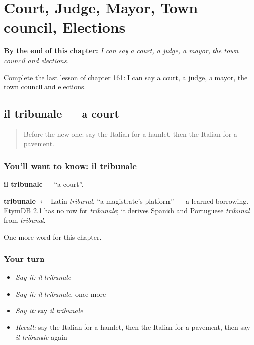 
\chapter{Court, Judge, Mayor, Town council, Elections}
\label{ch:it-court-judge-mayor-town-council-elections}

\begin{chapteropening}
\textbf{By the end of this chapter:} \emph{I can say a court, a judge, a mayor, the town council and elections.}

Complete the last lesson of chapter 161: I can say a court, a judge, a mayor, the town council and elections.
\end{chapteropening}

\section[il tribunale]{il tribunale — a court}

\label{lesson:IT-C161-tribunale}



\begin{quote}
Before the new one: say the Italian for a hamlet, then the Italian for a pavement.
\end{quote}

\subsection*{You'll want to know: il tribunale}
\textbf{il tribunale} — \textquotedblleft{}a court\textquotedblright{}.

\begin{cousinweb}
\textbf{tribunale} $\leftarrow$ Latin \emph{tribunal}, \textquotedblleft{}a magistrate's platform\textquotedblright{} — a learned borrowing. EtymDB 2.1 has no row for \emph{tribunale}; it derives Spanish and Portuguese \emph{tribunal} from \emph{tribunal}.
\end{cousinweb}

\begin{grammarlens}[title={What you've built}]
One more word for this chapter.
\end{grammarlens}

\subsection*{Your turn}
\begin{itemize}
\raggedright
  \item \emph{Say it:} \emph{il tribunale}
  \item \emph{Say it:} \emph{il tribunale}, once more
  \item \emph{Say it:} say \emph{il tribunale}
  \item \emph{Recall:} say the Italian for a hamlet, then the Italian for a pavement, then say \emph{il tribunale} again
\end{itemize}

